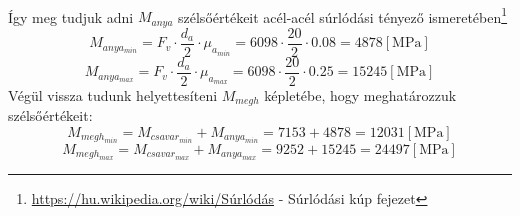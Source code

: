 \documentclass[10pt, a4paper]{article}
\newcommand{\mpa}{\mathrm{\left[MPa\right]}}
\begin{document}
			\renewcommand{\arraystretch}{1}\\
	Így meg tudjuk adni $M_{anya}$ szélsőértékeit acél-acél súrlódási tényező ismeretében\footnote{\href{https://hu.wikipedia.org/wiki/S\%C3\%BArl\%C3\%B3d\%C3\%A1s\#A\_s\%C3\%BArl\%C3\%B3d\%C3\%A1si\_k\%C3\%Bap}{https://hu.wikipedia.org/wiki/Súrlódás} - Súrlódási kúp fejezet}
	\begin{equation}
			M_{anya_{min}} = F_v \cdot \dfrac{d_a}{2} \cdot \mu_{a_{min}} = 6098 \cdot \dfrac{20}{2} \cdot 0.08 = 4878 \mpa\tag{5.2}
	\end{equation}
	\begin{equation}
			M_{anya_{max}} = F_v \cdot \dfrac{d_a}{2} \cdot \mu_{a_{max}} = 6098 \cdot \dfrac{20}{2} \cdot 0.25 = 15245\mpa\tag{5.2}
	\end{equation}
	Végül vissza tudunk helyettesíteni $M_{megh}$ képletébe, hogy meghatározzuk szélsőértékeit:
	\begin{equation}
			M_{megh_{min}} = M_{csavar_{min}} + M_{anya_{min}} = 7153 + 4878 = 12031 \mpa\tag{5}
	\end{equation}
	\begin{equation}
			M_{megh_{max}} = M_{csavar_{max}} + M_{anya_{max}} = 9252 + 15245 = 24497 \mpa\tag{5}
	\end{equation}
	\newpage
\end{document}
